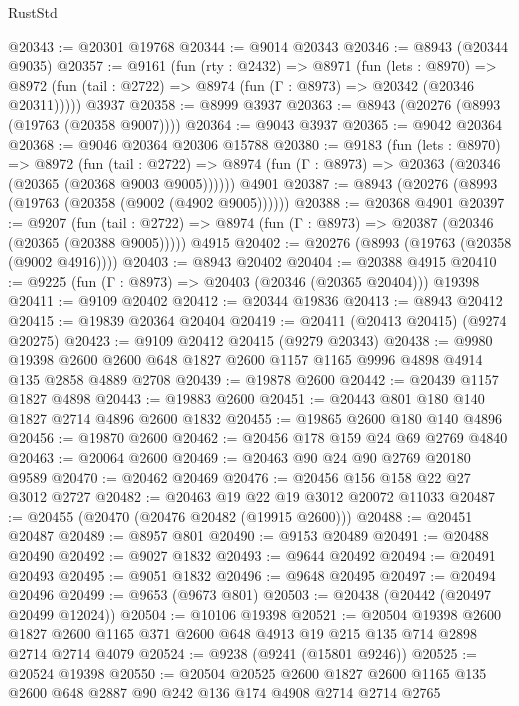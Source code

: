 \begin{lexlean}{RustStd}
\begin{coremodule}
@20343 := @20301 @19768
@20344 := @9014 @20343
@20346 := @8943 (@20344 @9035)
@20357 := @9161
    (fun (rty : @2432) =>
    @8971
      (fun (lets : @8970) =>
      @8972 (fun (tail : @2722) => @8974 (fun (Γ : @8973) => @20342 (@20346 @20311)))))
    @3937
@20358 := @8999 @3937
@20363 := @8943 (@20276 (@8993 (@19763 (@20358 @9007))))
@20364 := @9043 @3937
@20365 := @9042 @20364
@20368 := @9046 @20364 @20306 @15788
@20380 := @9183
    (fun (lets : @8970) =>
    @8972
      (fun (tail : @2722) =>
      @8974 (fun (Γ : @8973) => @20363 (@20346 (@20365 (@20368 @9003 @9005))))))
    @4901
@20387 := @8943 (@20276 (@8993 (@19763 (@20358 (@9002 (@4902 @9005))))))
@20388 := @20368 @4901
@20397 := @9207
    (fun (tail : @2722) => @8974 (fun (Γ : @8973) => @20387 (@20346 (@20365 (@20388 @9005)))))
    @4915
@20402 := @20276 (@8993 (@19763 (@20358 (@9002 @4916))))
@20403 := @8943 @20402
@20404 := @20388 @4915
@20410 := @9225 (fun (Γ : @8973) => @20403 (@20346 (@20365 @20404))) @19398
@20411 := @9109 @20402
@20412 := @20344 @19836
@20413 := @8943 @20412
@20415 := @19839 @20364 @20404
@20419 := @20411 (@20413 @20415) (@9274 @20275)
@20423 := @9109 @20412 @20415 (@9279 @20343)
@20438 := @9980
    @19398
    @2600
    @2600
    @648
    @1827
    @2600
    @1157
    @1165
    @9996
    @4898
    @4914
    @135
    @2858
    @4889
    @2708
@20439 := @19878 @2600
@20442 := @20439 @1157 @1827 @4898
@20443 := @19883 @2600
@20451 := @20443 @801 @180 @140 @1827 @2714 @4896 @2600 @1832
@20455 := @19865 @2600 @180 @140 @4896
@20456 := @19870 @2600
@20462 := @20456 @178 @159 @24 @69 @2769 @4840
@20463 := @20064 @2600
@20469 := @20463 @90 @24 @90 @2769 @20180 @9589
@20470 := @20462 @20469
@20476 := @20456 @156 @158 @22 @27 @3012 @2727
@20482 := @20463 @19 @22 @19 @3012 @20072 @11033
@20487 := @20455 (@20470 (@20476 @20482 (@19915 @2600)))
@20488 := @20451 @20487
@20489 := @8957 @801
@20490 := @9153 @20489
@20491 := @20488 @20490
@20492 := @9027 @1832
@20493 := @9644 @20492
@20494 := @20491 @20493
@20495 := @9051 @1832
@20496 := @9648 @20495
@20497 := @20494 @20496
@20499 := @9653 (@9673 @801)
@20503 := @20438 (@20442 (@20497 @20499 @12024))
@20504 := @10106 @19398
@20521 := @20504
    @19398
    @2600
    @1827
    @2600
    @1165
    @371
    @2600
    @648
    @4913
    @19
    @215
    @135
    @714
    @2898
    @2714
    @2714
    @4079
@20524 := @9238 (@9241 (@15801 @9246))
@20525 := @20524 @19398
@20550 := @20504
    @20525
    @2600
    @1827
    @2600
    @1165
    @135
    @2600
    @648
    @2887
    @90
    @242
    @136
    @174
    @4908
    @2714
    @2714
    @2765

\end{coremodule}
\end{lexlean}
